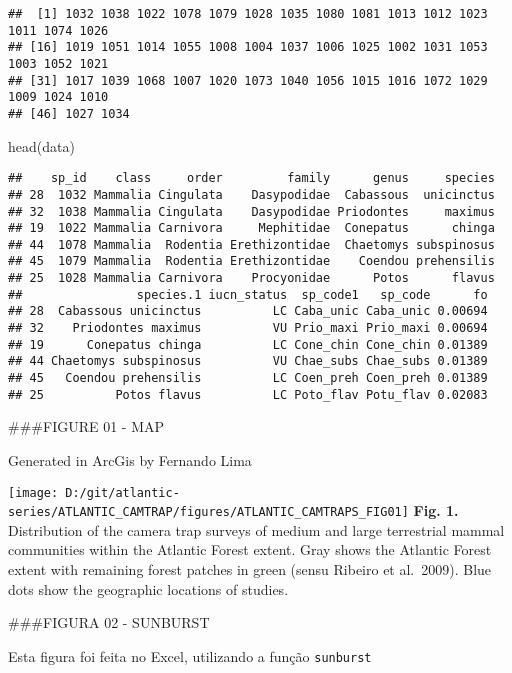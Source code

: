 \documentclass[
]{article}
\newenvironment{Shaded}{\begin{snugshade}}{\end{snugshade}}
\newcommand{\FunctionTok}[1]{\textcolor[rgb]{0.00,0.00,0.00}{#1}}
\newcommand{\NormalTok}[1]{#1}
\begin{document}
\begin{verbatim}
##  [1] 1032 1038 1022 1078 1079 1028 1035 1080 1081 1013 1012 1023 1011 1074 1026
## [16] 1019 1051 1014 1055 1008 1004 1037 1006 1025 1002 1031 1053 1003 1052 1021
## [31] 1017 1039 1068 1007 1020 1073 1040 1056 1015 1016 1072 1029 1009 1024 1010
## [46] 1027 1034
\end{verbatim}

\begin{Shaded}
\begin{Highlighting}[]
\FunctionTok{head}\NormalTok{(data)}
\end{Highlighting}
\end{Shaded}

\begin{verbatim}
##    sp_id    class     order         family      genus     species
## 28  1032 Mammalia Cingulata    Dasypodidae  Cabassous  unicinctus
## 32  1038 Mammalia Cingulata    Dasypodidae Priodontes     maximus
## 19  1022 Mammalia Carnivora     Mephitidae  Conepatus      chinga
## 44  1078 Mammalia  Rodentia Erethizontidae  Chaetomys subspinosus
## 45  1079 Mammalia  Rodentia Erethizontidae    Coendou prehensilis
## 25  1028 Mammalia Carnivora    Procyonidae      Potos      flavus
##                species.1 iucn_status  sp_code1   sp_code      fo
## 28  Cabassous unicinctus          LC Caba_unic Caba_unic 0.00694
## 32    Priodontes maximus          VU Prio_maxi Prio_maxi 0.00694
## 19      Conepatus chinga          LC Cone_chin Cone_chin 0.01389
## 44 Chaetomys subspinosus          VU Chae_subs Chae_subs 0.01389
## 45   Coendou prehensilis          LC Coen_preh Coen_preh 0.01389
## 25          Potos flavus          LC Poto_flav Potu_flav 0.02083
\end{verbatim}

\#\#\#FIGURE 01 - MAP

Generated in ArcGis by Fernando Lima

\texttt{[image: D:/git/atlantic-series/ATLANTIC\_CAMTRAP/figures/ATLANTIC\_CAMTRAPS\_FIG01]}
\textbf{Fig. 1.} Distribution of the camera trap surveys of medium and
large terrestrial mammal communities within the Atlantic Forest extent.
Gray shows the Atlantic Forest extent with remaining forest patches in
green (sensu Ribeiro et al.~2009). Blue dots show the geographic
locations of studies.

\#\#\#FIGURA 02 - SUNBURST

Esta figura foi feita no Excel, utilizando a função \texttt{sunburst}
\end{document}
